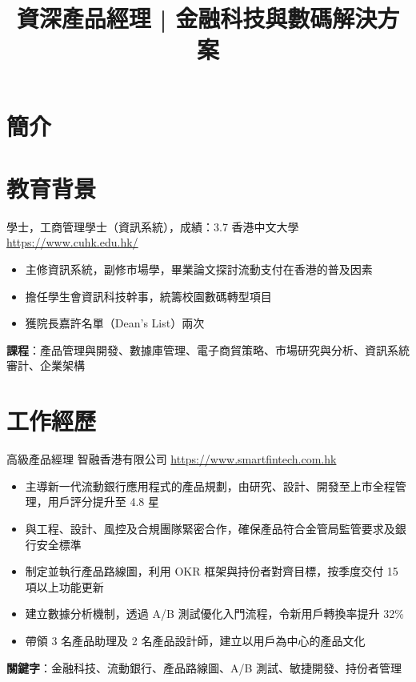 \documentclass[a4paper, serif, 10pt]{moderncv}
\title{資深產品經理 | 金融科技與數碼解決方案}
\begin{document}
\maketitle

\section{簡介}

\section{教育背景}

        {學士，工商管理學士（資訊系統），成績：3.7}
        {香港中文大學}
        {\url{https://www.cuhk.edu.hk/}}
        {}
        {\begin{itemize}
\item 主修資訊系統，副修市場學，畢業論文探討流動支付在香港的普及因素
\item 擔任學生會資訊科技幹事，統籌校園數碼轉型項目
\item 獲院長嘉許名單（Dean's List）兩次
\end{itemize}
\textbf{課程}：產品管理與開發、數據庫管理、電子商貿策略、市場研究與分析、資訊系統審計、企業架構}
\section{工作經歷}

        {高級產品經理}
        {智融香港有限公司}
        {\url{https://www.smartfintech.com.hk}}
        {}
        {\begin{itemize}
\item 主導新一代流動銀行應用程式的產品規劃，由研究、設計、開發至上市全程管理，用戶評分提升至 4.8 星
\item 與工程、設計、風控及合規團隊緊密合作，確保產品符合金管局監管要求及銀行安全標準
\item 制定並執行產品路線圖，利用 OKR 框架與持份者對齊目標，按季度交付 15 項以上功能更新
\item 建立數據分析機制，透過 A/B 測試優化入門流程，令新用戶轉換率提升 32\%
\item 帶領 3 名產品助理及 2 名產品設計師，建立以用戶為中心的產品文化
\end{itemize}
\textbf{關鍵字}：金融科技、流動銀行、產品路線圖、A/B 測試、敏捷開發、持份者管理}
\end{document}

